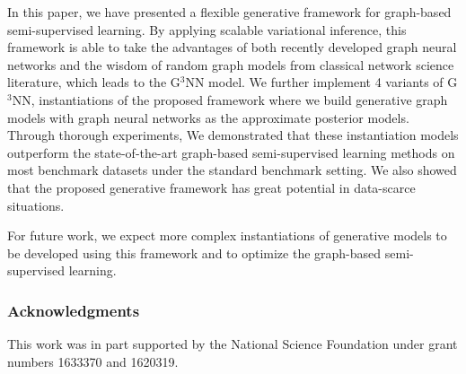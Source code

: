 \documentclass{article}
\begin{document}
In this paper, we have presented a flexible generative framework for graph-based semi-supervised learning. By applying scalable variational inference, this framework is able to take the advantages of both recently developed graph neural networks and the wisdom of random graph models from classical network science literature, which leads to the G$^3$NN model. We further implement 4 variants of G$^3$NN, instantiations of the proposed framework where we build generative graph models with graph neural networks as the approximate posterior models. Through thorough experiments, We demonstrated that these instantiation models outperform the state-of-the-art graph-based semi-supervised learning methods on most benchmark datasets under the standard benchmark setting. We also showed that the proposed generative framework has great potential in data-scarce situations. 

For future work, we expect more complex instantiations of generative models to be developed using this framework and to optimize the graph-based semi-supervised learning. 
\subsubsection*{Acknowledgments}
This work was in part supported by the National Science Foundation under grant numbers 1633370 and 1620319.



\end{document}
